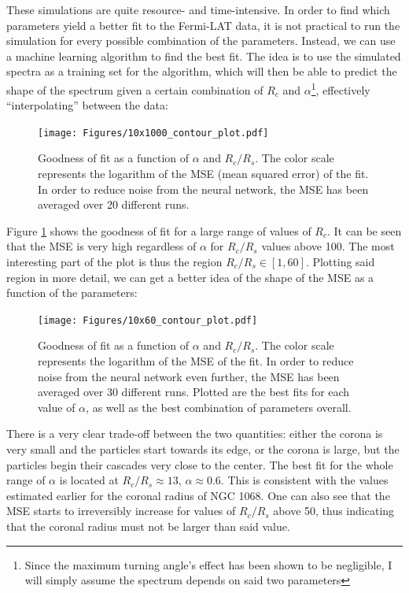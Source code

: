 These simulations are quite resource- and time-intensive. In order to find which parameters yield a better fit to the Fermi-LAT data, it is not practical to run the simulation for every possible combination of the parameters. Instead, we can use a machine learning algorithm to find the best fit. The idea is to use the simulated spectra as a training set for the algorithm, which will then be able to predict the shape of the spectrum given a certain combination of $R_c$ and $\alpha$\footnote{Since the maximum turning angle's effect has been shown to be negligible, I will simply assume the spectrum depends on said two parameters}, effectively ``interpolating'' between the data:

\begin{figure}[H]
    \texttt{[image: Figures/10x1000\_contour\_plot.pdf]}
    \centering
    \caption{Goodness of fit as a function of $\alpha$ and $R_c/R_s$. The color scale represents the logarithm of the MSE (mean squared error) of the fit. In order to reduce noise from the neural network, the MSE has been averaged over 20 different runs.}
    \label{fig:contour_plot_10x1000}
\end{figure}

Figure \ref{fig:contour_plot_10x1000} shows the goodness of fit for a large range of values of $R_c$. It can be seen that the MSE is very high regardless of $\alpha$ for $R_c/R_s$ values above 100. The most interesting part of the plot is thus the region $R_c/R_s \in [1, 60]$. Plotting said region in more detail, we can get a better idea of the shape of the MSE as a function of the parameters:
\begin{figure}[H]
    \texttt{[image: Figures/10x60\_contour\_plot.pdf]}
    \centering
    \caption{Goodness of fit as a function of $\alpha$ and $R_c/R_s$. The color scale represents the logarithm of the MSE of the fit. In order to reduce noise from the neural network even further, the MSE has been averaged over 30 different runs. Plotted are the best fits for each value of $\alpha$, as well as the best combination of parameters overall.}
    \label{fig:contour_plot_10x60}
\end{figure}

There is a very clear trade-off between the two quantities: either the corona is very small and the particles start towards its edge, or the corona is large, but the particles begin their cascades very close to the center. The best fit for the whole range of $\alpha$ is located at $R_c/R_s \approx 13$, $\alpha \approx 0.6$. This is consistent with the values estimated earlier for the coronal radius of NGC 1068. One can also see that the MSE starts to irreversibly increase for values of $R_c/R_s$ above 50, thus indicating that the coronal radius must not be larger than said value.

